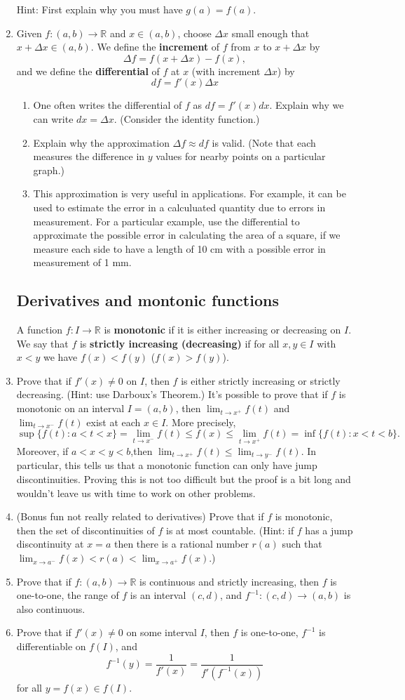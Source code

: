 \documentclass[letterpaper,12pt]{article}
\newcommand{\R}{\mathbb{R}}
\begin{document}
\begin{enumerate}
Hint: First explain why you must have $g(a)=f(a)$.
\item Given $f:(a,b)\to\R$ and $x\in (a,b)$, choose $\Delta x$ small enough that $x+\Delta x\in (a,b)$. We define the {\bf increment} of $f$ from $x$ to $x+\Delta x$ by
\[
 \Delta f = f(x+\Delta x)-f(x),
\]
and we define the {\bf differential} of $f$ at $x$ (with increment $\Delta x$) by
\[
 df = f'(x)\Delta x
\]
\begin{enumerate}
 \item One often writes the differential of $f$ as $df = f'(x)dx$. Explain why we can write $dx = \Delta x$. (Consider the identity function.)
 \item Explain why the approximation $\Delta f \approx df$ is valid. (Note that each measures the difference in $y$ values for nearby points on a particular graph.)
 \item This approximation is very useful in applications. For example, it can be used to estimate the error in a calculuated quantity due to errors in measurement. For a particular example, use the differential to approximate the possible error in calculating the area of a square, if we measure each side to have a length of 10 cm with a possible error in measurement of 1 mm.
\end{enumerate}
\newpage
\subsection*{Derivatives and montonic functions}
A function $f:I\to\R$ is {\bf monotonic} if it is either increasing or decreasing on $I$. We say that $f$ is {\bf strictly increasing (decreasing)} if for all $x,y\in I$ with $x<y$ we have $f(x)<f(y)$ ($f(x)>f(y)$).
\item Prove that if $f'(x)\neq 0$ on $I$, then $f$ is either strictly increasing or strictly decreasing. (Hint: use Darboux's Theorem.)
It's possible to prove that if $f$ is monotonic on an interval $I=(a,b)$, then $\lim_{t\to x^+}f(t)$ and $\lim_{t\to x^-}f(t)$ exist at each $x\in I$. More precisely,
\[
 \sup\{f(t) : a<t<x\} = \lim_{t\to x^-}f(t)\leq f(x)\leq \lim_{t\to x^+}f(t) = \inf\{f(t) : x<t<b\}.
\]
Moreover, if $a<x<y<b$,then $\lim_{t\to x^+}f(t)\leq \lim_{t\to y^-}f(t)$. In particular, this tells us that a monotonic function can only have jump discontinuities. Proving this is not too difficult but the proof is a bit long and wouldn't leave us with time to work on other problems.
\item (Bonus fun not really related to derivatives) Prove that if $f$ is monotonic, then the set of discontinuities of $f$ is at most countable. (Hint: if $f$ has a jump discontinuity at $x=a$ then there is a rational number $r(a)$ such that $\lim_{x\to a^-}f(x)<r(a)<\lim_{x\to a^+}f(x)$.)
\item Prove that if $f:(a,b)\to \R$ is continuous and strictly increasing, then $f$ is one-to-one, the range of $f$ is an interval $(c,d)$, and $f^{-1}:(c,d)\to (a,b)$ is also continuous.
\item Prove that if $f'(x)\neq 0$ on some interval $I$, then $f$ is one-to-one, $f^{-1}$ is differentiable on $f(I)$, and
\[
 f^{-1}(y) = \frac{1}{f'(x)} = \frac{1}{f'(f^{-1}(x))}
\]
for all $y=f(x)\in f(I)$.


\end{enumerate}
\end{document}
